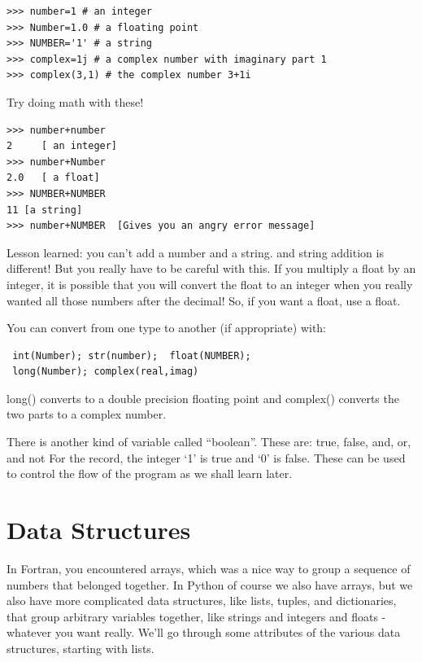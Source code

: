 \documentclass[11pt]{book}
\begin{document}
{ \color{blue} \begin{verbatim}
>>> number=1 # an integer
>>> Number=1.0 # a floating point
>>> NUMBER='1' # a string
>>> complex=1j # a complex number with imaginary part 1
>>> complex(3,1) # the complex number 3+1i 
\end{verbatim}}
\noindent
{Try doing math with these!}
{ \color{blue} \begin{verbatim}
>>> number+number
2     [ an integer]
>>> number+Number
2.0   [ a float]
>>> NUMBER+NUMBER
11 [a string]
>>> number+NUMBER  [Gives you an angry error message]
\end{verbatim}}
\noindent
 Lesson learned: you can't add a number and a string.  and string addition is different!  But you really have to be careful with this.  If you multiply a float by an integer, it is possible that you will convert the float to an integer when you really wanted all those numbers after the decimal! So, if you want a float, use a float.  
 
{ You can convert from one type to another (if appropriate) with:}
{ \color{blue} \begin{verbatim} 
 int(Number); str(number);  float(NUMBER); 
 long(Number); complex(real,imag)
 \end{verbatim}}
 
\noindent 
{\color{blue}long()} converts to a double precision floating point and {\color{blue}complex()} converts the two parts to a complex number.
 
 There is another kind of variable called ``boolean''. These are: {\color{blue}true}, {\color{blue}false}, {\color{blue}and}, {\color{blue}or}, and {\color{blue}not}
For the record, the integer  `1' is {\color{blue}true} and  `0' is {\color{blue}false}.  
These can be used to control the flow of the program as we shall learn later.  

\section{Data Structures}

In Fortran, you encountered arrays, which was a nice way to group a sequence of numbers that belonged together.  In Python of course we also have arrays, but we also have more complicated data structures, like lists, tuples, and dictionaries,  that group arbitrary variables together, like strings and integers and floats - whatever you want really. We'll go through some attributes of the various data structures, starting with lists.
\end{document}
